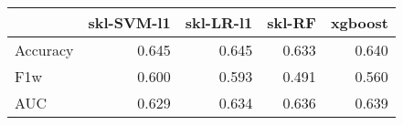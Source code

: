 \begin{tabular}{lrrrr}
\toprule
{} &  skl-SVM-l1 &  skl-LR-l1 &  skl-RF &  xgboost \\
\midrule
Accuracy &       0.645 &      0.645 &   0.633 &    0.640 \\
F1w      &       0.600 &      0.593 &   0.491 &    0.560 \\
AUC      &       0.629 &      0.634 &   0.636 &    0.639 \\
\bottomrule
\end{tabular}
